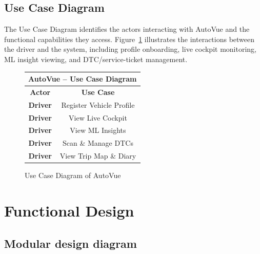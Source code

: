 \documentclass[10pt,a4paper]{report}
\begin{document}
\subsection{Use Case Diagram}

The Use Case Diagram identifies the actors interacting with AutoVue and the functional capabilities they access. Figure~\ref{usecase} illustrates the interactions between the driver and the system, including profile onboarding, live cockpit monitoring, ML insight viewing, and DTC/service-ticket management.

\begin{figure}[H]
\centering
\renewcommand{\arraystretch}{1.5}
\begin{tabular}{|c|c|}
\hline
\multicolumn{2}{|c|}{\textbf{AutoVue -- Use Case Diagram}} \\ \hline
\textbf{Actor} & \textbf{Use Case} \\ \hline
\textbf{Driver} & Register Vehicle Profile \\ \hline
\textbf{Driver} & View Live Cockpit \\ \hline
\textbf{Driver} & View ML Insights \\ \hline
\textbf{Driver} & Scan \& Manage DTCs \\ \hline
\textbf{Driver} & View Trip Map \& Diary \\ \hline
\end{tabular}
\caption{Use Case Diagram of AutoVue}
\label{usecase}
\end{figure}
\section{Functional Design}
\subsection{Modular design diagram}
\end{document}
